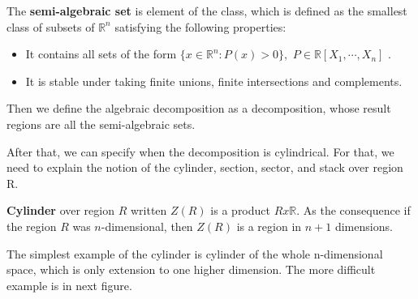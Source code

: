 \documentclass[
  digital, %
  twoside, %
  table,   %
  nolof,     %
  nolot,     %
]{fithesis3}
\begin{document}
\begin{definition}
The \textbf{semi-algebraic set} is element of the class, which is defined as the smallest class of subsets of
$\mathbb{R}^{n}$ satisfying the following properties:
\begin{itemize}
    \item It contains all sets of the form $\{x\in \mathbb{R}^{n}:P(x)>0\},$ $P\in \mathbb{R}[X_{1}, \cdots, X_{n}]$ .
    \item It is stable under taking finite unions, finite intersections and complements.
\end{itemize}
\end{definition}

Then we define the algebraic decomposition as a decomposition, whose result regions are all the semi-algebraic sets. 

 After that, we can specify when the decomposition is cylindrical. For that, we need to explain the notion of the cylinder, section, sector, and stack over region R.
\begin{definition}
\textbf{Cylinder} over region $R$ written $Z(R)$ is a product $R x \mathbb{R}$. As the consequence if the region $R$ was $n$-dimensional, then $Z(R)$ is a region in $n+1$ dimensions.
\end{definition}



The simplest example of the cylinder is cylinder of the whole n-dimensional space, which is only extension to one higher dimension. The more difficult example is in next figure.
\end{document}

